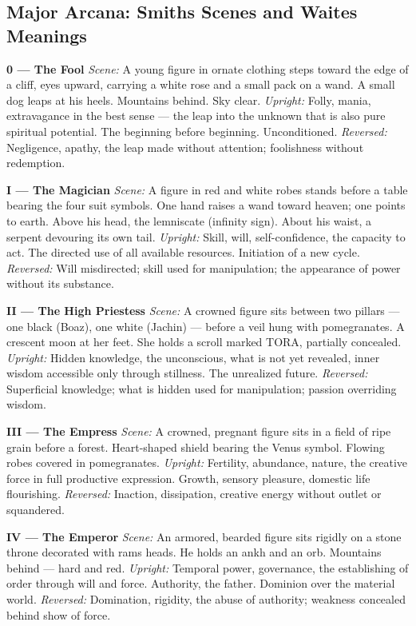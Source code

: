 \subsection{Major Arcana: Smith\textquotesingle s Scenes and Waite\textquotesingle s Meanings}\label{major-arcana-smiths-scenes-and-waites-meanings}

\textbf{0 --- The Fool} \emph{Scene:} A young figure in ornate clothing steps toward the edge of a cliff, eyes upward, carrying a white rose and a small pack on a wand. A small dog leaps at his heels. Mountains behind. Sky clear. \emph{Upright:} Folly, mania, extravagance in the best sense --- the leap into the unknown that is also pure spiritual potential. The beginning before beginning. Unconditioned. \emph{Reversed:} Negligence, apathy, the leap made without attention; foolishness without redemption.

\textbf{I --- The Magician} \emph{Scene:} A figure in red and white robes stands before a table bearing the four suit symbols. One hand raises a wand toward heaven; one points to earth. Above his head, the lemniscate (infinity sign). About his waist, a serpent devouring its own tail. \emph{Upright:} Skill, will, self-confidence, the capacity to act. The directed use of all available resources. Initiation of a new cycle. \emph{Reversed:} Will misdirected; skill used for manipulation; the appearance of power without its substance.

\textbf{II --- The High Priestess} \emph{Scene:} A crowned figure sits between two pillars --- one black (Boaz), one white (Jachin) --- before a veil hung with pomegranates. A crescent moon at her feet. She holds a scroll marked TORA, partially concealed. \emph{Upright:} Hidden knowledge, the unconscious, what is not yet revealed, inner wisdom accessible only through stillness. The unrealized future. \emph{Reversed:} Superficial knowledge; what is hidden used for manipulation; passion overriding wisdom.

\textbf{III --- The Empress} \emph{Scene:} A crowned, pregnant figure sits in a field of ripe grain before a forest. Heart-shaped shield bearing the Venus symbol. Flowing robes covered in pomegranates. \emph{Upright:} Fertility, abundance, nature, the creative force in full productive expression. Growth, sensory pleasure, domestic life flourishing. \emph{Reversed:} Inaction, dissipation, creative energy without outlet or squandered.

\textbf{IV --- The Emperor} \emph{Scene:} An armored, bearded figure sits rigidly on a stone throne decorated with rams\textquotesingle{} heads. He holds an ankh and an orb. Mountains behind --- hard and red. \emph{Upright:} Temporal power, governance, the establishing of order through will and force. Authority, the father. Dominion over the material world. \emph{Reversed:} Domination, rigidity, the abuse of authority; weakness concealed behind show of force.

